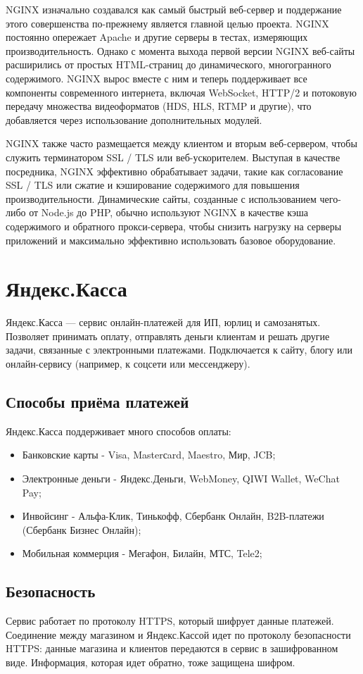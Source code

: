 NGINX изначально создавался как самый быстрый веб-сервер и поддержание этого совершенства по-прежнему является главной целью проекта. NGINX постоянно опережает Apache и другие серверы в тестах, измеряющих производительность. Однако с момента выхода первой версии NGINX веб-сайты расширились от простых HTML-страниц до динамического, многогранного содержимого. NGINX вырос вместе с ним и теперь поддерживает все компоненты современного интернета, включая WebSocket, HTTP/2 и потоковую передачу множества видеоформатов (HDS, HLS, RTMP и другие), что добавляется через использование дополнительных модулей.


NGINX также часто размещается между клиентом и вторым веб-сервером, чтобы служить терминатором SSL / TLS или веб-ускорителем. Выступая в качестве посредника, NGINX эффективно обрабатывает задачи, такие как согласование SSL / TLS или сжатие и кэширование содержимого для повышения производительности. Динамические сайты, созданные с использованием чего-либо от Node.js до PHP, обычно используют NGINX в качестве кэша содержимого и обратного прокси-сервера, чтобы снизить нагрузку на серверы приложений и максимально эффективно использовать базовое оборудование.
\section{Яндекс.Касса}\label{sec:ch3/sect10}
Яндекс.Касса — сервис онлайн-платежей для ИП, юрлиц и самозанятых. Позволяет принимать оплату, отправлять деньги клиентам и решать другие задачи, связанные с электронными платежами. Подключается к сайту, блогу или онлайн-сервису (например, к соцсети или мессенджеру).

\subsection{Способы приёма платежей}\label{sec:pay_types}
Яндекс.Касса поддерживает много способов оплаты:
\begin{itemize}
  \item Банковские карты - Visa, Masterсard, Maestro, Мир, JCB;
  \item Электронные деньги - Яндекс.Деньги, WebMoney, QIWI Wallet, WeChat Pay;
  \item Инвойсинг - Альфа-Клик, Тинькофф, Сбербанк Онлайн, B2B-платежи (Сбербанк Бизнес Онлайн);
  \item Мобильная коммерция - Мегафон, Билайн, МТС, Tele2;
\end{itemize}


\subsection{Безопасность}\label{sec:pay_security}
Сервис работает по протоколу HTTPS, который шифрует данные платежей.
Соединение между магазином и Яндекс.Кассой идет по протоколу безопасности HTTPS: данные магазина и клиентов передаются в сервис в зашифрованном виде. Информация, которая идет обратно, тоже защищена шифром.


